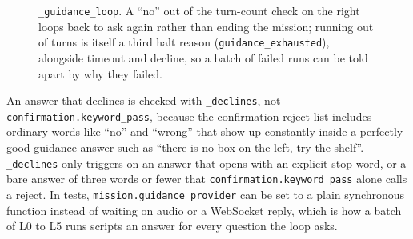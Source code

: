 \begin{figure}[htbp]
  \centering
  \caption{\texttt{\_guidance\_loop}. A ``no'' out of the turn-count check on the right loops back to ask again rather than ending the mission; running out of turns is itself a third halt reason (\texttt{guidance\_exhausted}), alongside timeout and decline, so a batch of failed runs can be told apart by why they failed.}
  \label{fig:flow-guidance}
\end{figure}

An answer that declines is checked with \texttt{\_declines}, not
\texttt{confirmation.keyword\_pass}, because the confirmation reject list
includes ordinary words like ``no'' and ``wrong'' that show up constantly
inside a perfectly good guidance answer such as ``there is no box on the
left, try the shelf''. \texttt{\_declines} only triggers on an answer that
opens with an explicit stop word, or a bare answer of three words or fewer
that \texttt{confirmation.keyword\_pass} alone calls a reject. In tests,
\texttt{mission.guidance\_provider} can be set to a plain synchronous
function instead of waiting on audio or a WebSocket reply, which is how a
batch of L0 to L5 runs scripts an answer for every question the loop asks.


